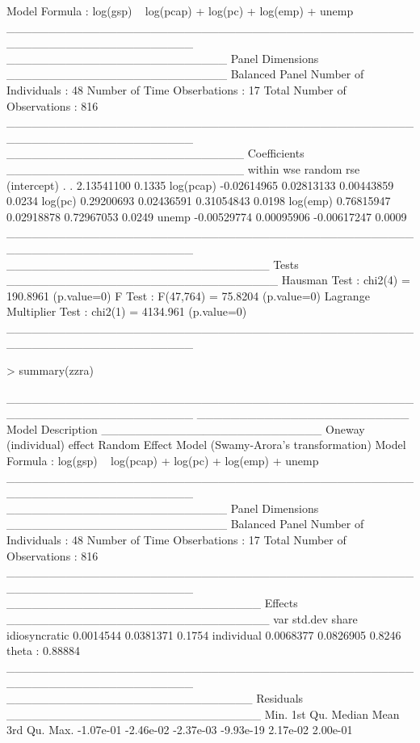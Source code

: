 \documentclass{article}
\begin{document}
\begin{Schunk}
\begin{Soutput}
Model Formula        : log(gsp) ~ log(pcap) + log(pc) + log(emp) + 
                           unemp
______________________________________________________________________ 
__________________________ Panel Dimensions __________________________
Balanced Panel
Number of Individuals        :  48
Number of Time Obserbations  :  17
Total Number of Observations :  816
______________________________________________________________________ 
____________________________ Coefficients ____________________________
                 within         wse      random    rse
(intercept)           .           .  2.13541100 0.1335
log(pcap)   -0.02614965  0.02813133  0.00443859 0.0234
log(pc)      0.29200693  0.02436591  0.31054843 0.0198
log(emp)     0.76815947  0.02918878  0.72967053 0.0249
unemp       -0.00529774  0.00095906 -0.00617247 0.0009
______________________________________________________________________ 
_______________________________ Tests ________________________________
Hausman Test                   : chi2(4) = 190.8961 (p.value=0)
F Test                         : F(47,764) = 75.8204 (p.value=0)
Lagrange Multiplier Test       : chi2(1) = 4134.961 (p.value=0)
______________________________________________________________________ 
\end{Soutput}
\begin{Sinput}
> summary(zzra)
\end{Sinput}
\begin{Soutput}
______________________________________________________________________ 
_________________________ Model Description __________________________
Oneway (individual) effect
Random Effect Model (Swamy-Arora's transformation)
Model Formula            : log(gsp) ~ log(pcap) + log(pc) + log(emp) + 
                               unemp
______________________________________________________________________ 
__________________________ Panel Dimensions __________________________
Balanced Panel
Number of Individuals        :  48
Number of Time Obserbations  :  17
Total Number of Observations :  816
______________________________________________________________________ 
______________________________ Effects _______________________________
                    var   std.dev  share
idiosyncratic 0.0014544 0.0381371 0.1754
individual    0.0068377 0.0826905 0.8246
theta   :  0.88884  
______________________________________________________________________ 
_____________________________ Residuals ______________________________
     Min.   1st Qu.    Median      Mean   3rd Qu.      Max. 
-1.07e-01 -2.46e-02 -2.37e-03 -9.93e-19  2.17e-02  2.00e-01 

\end{Soutput}
\end{Schunk}
\end{document}
